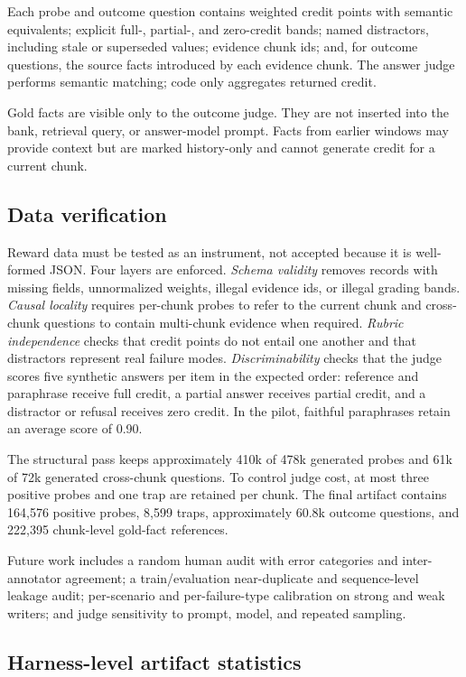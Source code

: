 \documentclass{article}
\begin{document}
Each probe and outcome question contains weighted credit points with semantic equivalents; explicit full-, partial-, and zero-credit bands; named distractors, including stale or superseded values; evidence chunk ids; and, for outcome questions, the source facts introduced by each evidence chunk. The answer judge performs semantic matching; code only aggregates returned credit.

Gold facts are visible only to the outcome judge. They are not inserted into the bank, retrieval query, or answer-model prompt. Facts from earlier windows may provide context but are marked history-only and cannot generate credit for a current chunk.

\subsection{Data verification}

Reward data must be tested as an instrument, not accepted because it is well-formed JSON. Four layers are enforced. \emph{Schema validity} removes records with missing fields, unnormalized weights, illegal evidence ids, or illegal grading bands. \emph{Causal locality} requires per-chunk probes to refer to the current chunk and cross-chunk questions to contain multi-chunk evidence when required. \emph{Rubric independence} checks that credit points do not entail one another and that distractors represent real failure modes. \emph{Discriminability} checks that the judge scores five synthetic answers per item in the expected order: reference and paraphrase receive full credit, a partial answer receives partial credit, and a distractor or refusal receives zero credit. In the pilot, faithful paraphrases retain an average score of 0.90.

The structural pass keeps approximately 410k of 478k generated probes and 61k of 72k generated cross-chunk questions. To control judge cost, at most three positive probes and one trap are retained per chunk. The final artifact contains 164{,}576 positive probes, 8{,}599 traps, approximately 60.8k outcome questions, and 222{,}395 chunk-level gold-fact references.

Future work includes a random human audit with error categories and inter-annotator agreement; a train/evaluation near-duplicate and sequence-level leakage audit; per-scenario and per-failure-type calibration on strong and weak writers; and judge sensitivity to prompt, model, and repeated sampling.

\subsection{Harness-level artifact statistics}
\end{document}
